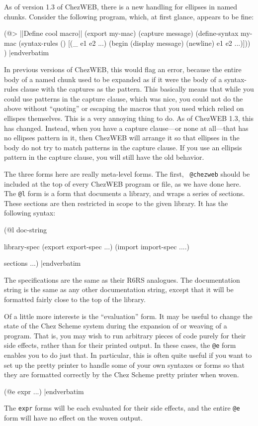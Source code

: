 %
As of version 1.3 of ChezWEB, there is a new handling for ellipses in named
chunks. Consider the following program, which, at first glance, appears
to be fine:

\medskip\verbatim
(@> ||Define cool macro|| 
  (export my-mac) 
  (capture message)
(define-syntax my-mac
  (syntax-rules ()
    [(_ e1 e2 ...)
     (begin
       (display message) (newline)
       e1 e2 ...)]))
)
|endverbatim
\medskip

\noindent 
In previous versions of ChezWEB, this would flag an error, because the
entire body of a named chunk used to be expanded as if it were the body
of a syntax-rules clause with the captures as the pattern. This
basically means that while you could use patterns in the capture clause,
which was nice, you could not do the above without ``quoting'' or
escaping the macros that you used which relied on ellispes themselves.
This is a very annoying thing to do. As of ChezWEB 1.3, this has
changed. Instead, when you have a capture clause---or none at all---that
has no ellipses pattern in it, then ChezWEB will arrange it so that
ellipses in the body do not try to match patterns in the capture
clause. If you use an ellipsis pattern in the capture clause, you will
still have the old behavior.

%
The three forms here are really meta-level forms.  The first, {\tt
@chezweb} should be included at the top of every ChezWEB program or
file, as we have done here.  The {\tt @l} form is a form
that documents a library, and wraps a series of sections.  These
sections are then restricted in scope to the given library.  It has
the following syntax:

\medskip\verbatim
(@l doc-string

library-spec
(export export-spec ...)
(import import-spec ....)

sections ...)
|endverbatim
\medskip

\noindent
The specifications are the same as their R6RS analogues.  The
documentation string is the same as any other documentation string,
except that it will be formatted fairly close to the top of the
library.

Of a little more intereste is the ``evaluation'' form. 
It may be useful to change the state of the Chez Scheme system 
during the expansion of or weaving of a program. That is, you may wish
to run arbitrary pieces of code purely for their side effects, rather
than for their printed output. In these cases, the {\tt @e} form enables
you to do just that. In particular, this is often quite useful if you
want to set up the pretty printer to handle some of your own syntaxes or
forms so that they are formatted correctly by the Chez Scheme pretty
printer when woven.

\medskip\verbatim
(@e expr ...)
|endverbatim
\medskip

\noindent The {\tt expr} forms will be each evaluated for their side
effects, and the entire {\tt @e} form will have no effect on the woven
output.

\bye

